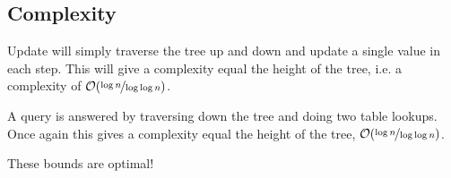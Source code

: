 \documentclass[a4paper,oneside,article,11pt]{memoir}
\begin{document}
\subsection{Complexity}
Update will simply traverse the tree up and down and update a single value in each step. This will give a complexity equal the height of the tree, i.e. a complexity of $\mathcal{O}(\nicefrac{\log n}{\log\log n})$.

A query is answered by traversing down the tree and doing two table lookups. Once again this gives a complexity equal the height of the tree, $\mathcal{O}(\nicefrac{\log n}{\log\log n})$.

These bounds are optimal!


\end{document}
